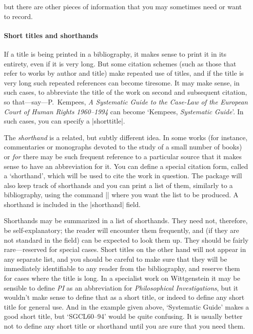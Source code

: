  but there are other pieces of information
that you may sometimes need or want to record.

\paragraph{Short titles and shorthands} If a title is being printed in
a bibliography, it makes sense to print it in its entirety, even if it
is very long. But some citation schemes (such as those that refer to
works by author and title) make repeated use of titles, and if the
title is very long such repeated references can become tiresome. It
may make sense, in such cases, to abbreviate the title of the work on
second and subsequent citation, so that---say---P.\ Kempees, \emph{A
  Systematic Guide to the Case-Law of the European Court of Human
  Rights 1960--1994} can become `Kempees, \emph{Systematic Guide}'. In
such cases, you can specify a |shorttitle|.

The \emph{shorthand} is a related, but subtly different idea. In some
works (for instance, commentaries or monographs devoted to the study
of a small number of books) or \emph{for} there may be such frequent
reference to a particular source that it makes sense to have an
abbreviation for it. You can define a special citation form, called a
`shorthand', which will be used to cite the work in question. The
package will also keep track of shorthands and you can print a list of
them, similarly to a bibliography, using the command
|\printshorthands| where you want the list to be produced. A shorthand is included in the
|shorthand| field.

Shorthands may be summarized in a list of shorthands. They need not,
therefore, be self-explanatory; the reader will encounter them
frequently, and (if they are not standard in the field) can be
expected to look them up. They should be fairly rare---reserved for
special cases. Short titles on the other hand will not appear in any
separate list, and you should be careful to make sure that they will
be immediately identifiable to any reader from the bibliography, and
reserve them for cases where the title is long. In a specialist work
on Wittgenstein it may be sensible to define \emph{PI} as an
abbreviation for \emph{Philosophical Investigations}, but it wouldn't
make sense to define that as a short title, or indeed to define any
short title for general use. And in the example given above,
`Systematic Guide' makes a good short title, but `SGCL60--94' would be
quite confusing. It is usually better not to define any short title or
shorthand until you are sure that you need them.

